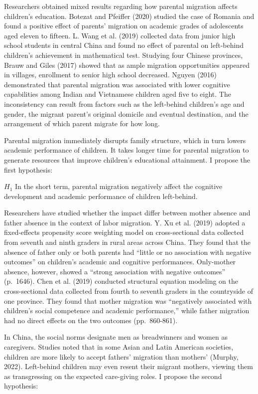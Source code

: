 \documentclass[
  man,floatsintext]{apa7}
\begin{document}
Researchers obtained mixed results regarding how parental migration affects children's education. Botezat and Pfeiffer (2020) studied the case of Romania and found a positive effect of parents' migration on academic grades of adolescents aged eleven to fifteen. L. Wang et al. (2019) collected data from junior high school students in central China and found no effect of parental on left-behind children's achievement in mathematical test. Studying four Chinese provinces, Brauw and Giles (2017) showed that as ample migration opportunities appeared in villages, enrollment to senior high school decreased. Nguyen (2016) demonstrated that parental migration was associated with lower cognitive capabilities among Indian and Vietnamese children aged five to eight. The inconsistency can result from factors such as the left-behind children's age and gender, the migrant parent's original domicile and eventual destination, and the arrangement of which parent migrate for how long.

Parental migration immediately disrupts family structure, which in turn lowers academic performance of children. It takes longer time for parental migration to generate resources that improve children's educational attainment. I propose the first hypothesis:

\(H_1\) In the short term, parental migration negatively affect the cognitive development and academic performance of children left-behind.

Researchers have studied whether the impact differ between mother absence and father absence in the context of labor migration. Y. Xu et al. (2019) adopted a fixed-effects propensity score weighting model on cross-sectional data collected from seventh and ninth graders in rural areas across China. They found that the absence of father only or both parents had ``little or no association with negative outcomes'' on children's academic and cognitive performances. Only-mother absence, however, showed a ``strong association with negative outcomes'' (p.~1646). Chen et al. (2019) conducted structural equation modeling on the cross-sectional data collected from fourth to seventh graders in the countryside of one province. They found that mother migration was ``negatively associated with children's social competence and academic performance,'' while father migration had no direct effects on the two outcomes (pp.~860-861).

In China, the social norms designate men as breadwinners and women as caregivers. Studies noted that in some Asian and Latin American societies, children are more likely to accept fathers' migration than mothers' (Murphy, 2022). Left-behind children may even resent their migrant mothers, viewing them as transgressing on the expected care-giving roles. I propose the second hypothesis:
\end{document}
